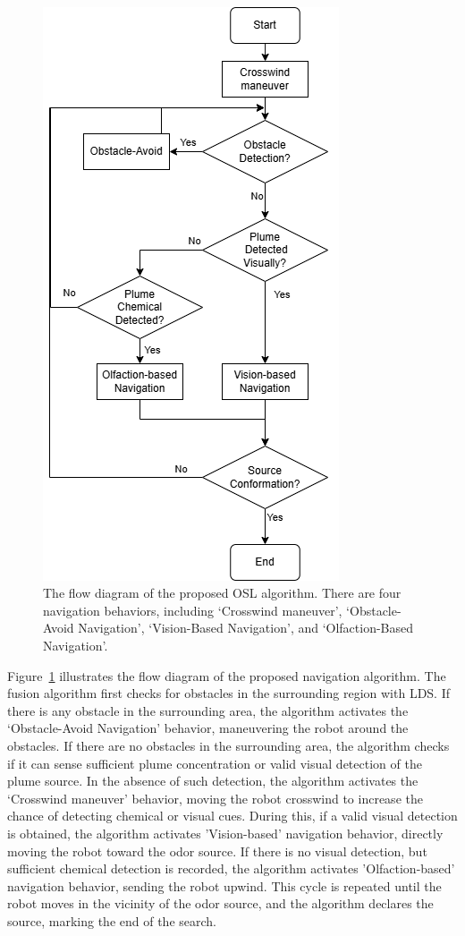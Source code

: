 \begin{figure}[h!] %

\ \\
\vspace*{-.18in}

\begin{center}
\includegraphics[width=0.5\columnwidth]{Main/Figure/FusionFlowDiagram.png}\hspace*{0.04in}
\end{center}
\vspace{-.1in}

\caption
{The flow diagram of the proposed OSL algorithm. There are four navigation behaviors, including `Crosswind maneuver', `Obstacle-Avoid Navigation', `Vision-Based Navigation', and `Olfaction-Based Navigation'.}
\label{fig:flow_diagram}
\end{figure}

Figure~\ref{fig:flow_diagram} illustrates the flow diagram of the proposed navigation algorithm. The fusion algorithm first checks for obstacles in the surrounding region with LDS. If there is any obstacle in the surrounding area, the algorithm activates the `Obstacle-Avoid Navigation' behavior, maneuvering the robot around the obstacles. If there are no obstacles in the surrounding area, the algorithm checks if it can sense sufficient plume concentration or valid visual detection of the plume source. In the absence of such detection, the algorithm activates the `Crosswind maneuver' behavior, moving the robot crosswind to increase the chance of detecting chemical or visual cues. During this, if a valid visual detection is obtained, the algorithm activates 'Vision-based' navigation behavior, directly moving the robot toward the odor source. If there is no visual detection, but sufficient chemical detection is recorded, the algorithm activates 'Olfaction-based' navigation behavior, sending the robot upwind. This cycle is repeated until the robot moves in the vicinity of the odor source, and the algorithm declares the source, marking the end of the search.

